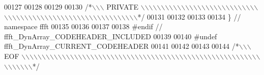 \begin{DoxyCode}
00127 
00128 
00129 
00130 \textcolor{comment}{/*\(\backslash\)\(\backslash\)\(\backslash\) PRIVATE \(\backslash\)\(\backslash\)\(\backslash\)\(\backslash\)\(\backslash\)\(\backslash\)\(\backslash\)\(\backslash\)\(\backslash\)\(\backslash\)\(\backslash\)\(\backslash\)\(\backslash\)\(\backslash\)\(\backslash\)\(\backslash\)\(\backslash\)\(\backslash\)\(\backslash\)\(\backslash\)\(\backslash\)\(\backslash\)\(\backslash\)\(\backslash\)\(\backslash\)\(\backslash\)\(\backslash\)\(\backslash\)\(\backslash\)\(\backslash\)\(\backslash\)\(\backslash\)\(\backslash\)\(\backslash\)\(\backslash\)\(\backslash\)\(\backslash\)\(\backslash\)\(\backslash\)\(\backslash\)\(\backslash\)\(\backslash\)\(\backslash\)\(\backslash\)\(\backslash\)\(\backslash\)\(\backslash\)\(\backslash\)\(\backslash\)\(\backslash\)\(\backslash\)\(\backslash\)\(\backslash\)\(\backslash\)\(\backslash\)\(\backslash\)\(\backslash\)\(\backslash\)\(\backslash\)\(\backslash\)\(\backslash\)\(\backslash\)*/}
00131 
00132 
00133 
00134 \}   \textcolor{comment}{// namespace ffft}
00135 
00136 
00137 
00138 \textcolor{preprocessor}{#endif  // ffft\_DynArray\_CODEHEADER\_INCLUDED}
00139 
00140 \textcolor{preprocessor}{#undef ffft\_DynArray\_CURRENT\_CODEHEADER}
00141 
00142 
00143 
00144 \textcolor{comment}{/*\(\backslash\)\(\backslash\)\(\backslash\) EOF \(\backslash\)\(\backslash\)\(\backslash\)\(\backslash\)\(\backslash\)\(\backslash\)\(\backslash\)\(\backslash\)\(\backslash\)\(\backslash\)\(\backslash\)\(\backslash\)\(\backslash\)\(\backslash\)\(\backslash\)\(\backslash\)\(\backslash\)\(\backslash\)\(\backslash\)\(\backslash\)\(\backslash\)\(\backslash\)\(\backslash\)\(\backslash\)\(\backslash\)\(\backslash\)\(\backslash\)\(\backslash\)\(\backslash\)\(\backslash\)\(\backslash\)\(\backslash\)\(\backslash\)\(\backslash\)\(\backslash\)\(\backslash\)\(\backslash\)\(\backslash\)\(\backslash\)\(\backslash\)\(\backslash\)\(\backslash\)\(\backslash\)\(\backslash\)\(\backslash\)\(\backslash\)\(\backslash\)\(\backslash\)\(\backslash\)\(\backslash\)\(\backslash\)\(\backslash\)\(\backslash\)\(\backslash\)\(\backslash\)\(\backslash\)\(\backslash\)\(\backslash\)\(\backslash\)\(\backslash\)\(\backslash\)\(\backslash\)\(\backslash\)\(\backslash\)\(\backslash\)\(\backslash\)*/}
\end{DoxyCode}
